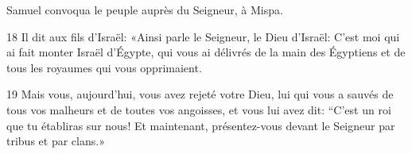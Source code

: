 Samuel convoqua le peuple auprès du Seigneur, à Mispa.

18 Il dit aux fils d’Israël: «Ainsi parle le Seigneur, le Dieu d’Israël: C’est moi qui ai fait monter Israël d’Égypte, qui vous ai délivrés de la main des Égyptiens et de tous les royaumes qui vous opprimaient.

19 Mais vous, aujourd’hui, vous avez rejeté votre Dieu, lui qui vous a sauvés de tous vos malheurs et de toutes vos angoisses, et vous lui avez dit: “C’est un roi que tu établiras sur nous! Et maintenant, présentez-vous devant le Seigneur par tribus et par clans.»
